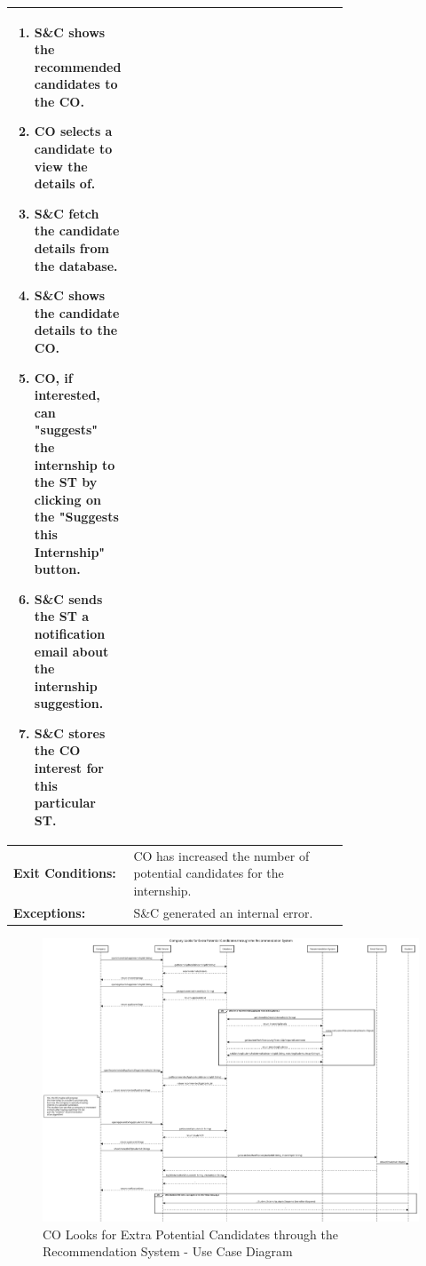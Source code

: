 \begin{center}
\begin{longtable}{|l|p{0.75\linewidth}|}
\begin{enumerate}
\begin{enumerate}
                  \end{enumerate}
                                         \item S\&C shows the recommended candidates to the CO.
                                         \item CO selects a candidate to view the details of.
                                         \item S\&C fetch the candidate details from the database.
                                         \item S\&C shows the candidate details to the CO.
                                         \item CO, if interested, can "suggests" the internship to the ST by clicking on the "Suggests this Internship" button.
                                         \item S\&C sends the ST a notification email about the internship suggestion.
                                         \item S\&C stores the CO interest for this particular ST.
                                     \end{enumerate} \\
        \hline
        \textbf{Exit Conditions:}  & CO has increased the number of potential candidates for the internship.                                               \\
        \hline
        \textbf{Exceptions:}       & S\&C generated an internal error.                                                                                     \\
        \hline
    \end{longtable}
\end{center}

\begin{figure}[H]
    \centering
    \includegraphics[width=1.0\textwidth]{Images/UC_10.pdf}
    \caption{CO Looks for Extra Potential Candidates through the Recommendation System - Use Case Diagram}
    \label{fig:use-case-diagram-10}
\end{figure}

